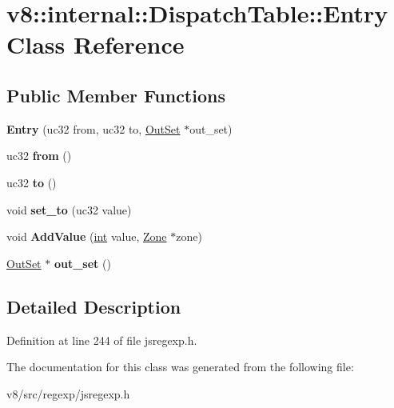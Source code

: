 \hypertarget{classv8_1_1internal_1_1DispatchTable_1_1Entry}{}\section{v8\+:\+:internal\+:\+:Dispatch\+Table\+:\+:Entry Class Reference}
\label{classv8_1_1internal_1_1DispatchTable_1_1Entry}
\subsection*{Public Member Functions}
\begin{DoxyCompactItemize}
\item 
\mbox{\label{classv8_1_1internal_1_1DispatchTable_1_1Entry_aaa7ddd692c547254688aeb3020ff1fb1}} 
{\bfseries Entry} (uc32 from, uc32 to, \mbox{\hyperlink{classv8_1_1internal_1_1OutSet}{Out\+Set}} $\ast$out\+\_\+set)
\item 
\mbox{\label{classv8_1_1internal_1_1DispatchTable_1_1Entry_aa240b5eee35d2b7ce9629f3a4f18a206}} 
uc32 {\bfseries from} ()
\item 
\mbox{\label{classv8_1_1internal_1_1DispatchTable_1_1Entry_a381bd5583e5270f9fe9ffafd7fd7c1dc}} 
uc32 {\bfseries to} ()
\item 
\mbox{\label{classv8_1_1internal_1_1DispatchTable_1_1Entry_a153e03e949110733bcc4b59b6dea4ca1}} 
void {\bfseries set\+\_\+to} (uc32 value)
\item 
\mbox{\label{classv8_1_1internal_1_1DispatchTable_1_1Entry_a8fa8b735da68812c171572d669c6965e}} 
void {\bfseries Add\+Value} (\mbox{\hyperlink{classint}{int}} value, \mbox{\hyperlink{classv8_1_1internal_1_1Zone}{Zone}} $\ast$zone)
\item 
\mbox{\label{classv8_1_1internal_1_1DispatchTable_1_1Entry_ad0ba8c0ec934677a57c37f6f4eb9b1b0}} 
\mbox{\hyperlink{classv8_1_1internal_1_1OutSet}{Out\+Set}} $\ast$ {\bfseries out\+\_\+set} ()
\end{DoxyCompactItemize}


\subsection{Detailed Description}


Definition at line 244 of file jsregexp.\+h.



The documentation for this class was generated from the following file\+:\begin{DoxyCompactItemize}
\item 
v8/src/regexp/jsregexp.\+h\end{DoxyCompactItemize}

